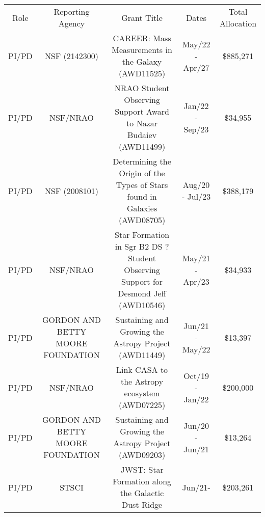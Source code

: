 \begin{tabular}{ccccc}
Role & Reporting Agency & Grant Title & Dates & Total  Allocation  \\
PI/PD & NSF (2142300) & CAREER: Mass Measurements in the Galaxy (AWD11525) & May/22 - Apr/27 & \$885,271  \\
PI/PD & NSF/NRAO & NRAO Student Observing Support Award to Nazar Budaiev (AWD11499) & Jan/22 - Sep/23 & \$34,955  \\
PI/PD & NSF (2008101) & Determining the Origin of the Types of Stars found in Galaxies (AWD08705) & Aug/20 - Jul/23 & \$388,179  \\
PI/PD & NSF/NRAO & Star Formation in Sgr B2 DS ? Student Observing Support for Desmond Jeff (AWD10546) & May/21 - Apr/23 & \$34,933   \\
PI/PD & GORDON AND BETTY MOORE FOUNDATION & Sustaining and Growing the Astropy Project (AWD11449) & Jun/21 - May/22 & \$13,397   \\
PI/PD & NSF/NRAO & Link CASA to the Astropy ecosystem (AWD07225) & Oct/19 - Jan/22 & \$200,000   \\
PI/PD & GORDON AND BETTY MOORE FOUNDATION & Sustaining and Growing the Astropy Project (AWD09203) & Jun/20 - Jun/21 & \$13,264   \\
PI/PD & STSCI & JWST: Star Formation along the Galactic Dust Ridge & Jun/21- &  \$203,261 \\
\end{tabular}

